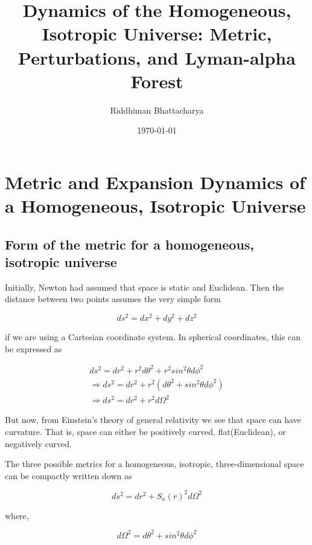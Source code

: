 \documentclass[a4,12pt,oneside]{report}
\begin{document}
	\title{\textbf{Dynamics of the Homogeneous, Isotropic Universe: Metric, Perturbations, and Lyman-alpha Forest}}
\author{Riddhiman Bhattacharya}	
 \date{\today}
	
	\maketitle
	
	
	\tableofcontents

	
	\chapter{Metric and Expansion Dynamics of a Homogeneous, Isotropic Universe}
	
	\section{Form of the metric for a homogeneous, isotropic universe}
	
	Initially, Newton had assumed that space is static and Euclidean. Then the distance between two points assumes the very simple form
	
	\begin{equation}
		ds^2=dx^2+dy^2+dz^2
	\end{equation}
	
	if we are using a Cartesian coordinate system. In spherical coordinates, this can be expressed as

	\begin{align}
	ds^2=dr^2+ r^2d\theta^2 + r^2sin^2\theta d\phi^2	\\
	\Rightarrow ds^2=dr^2+ r^2(d\theta^2+sin^2\theta d\phi^2) \\
	\Rightarrow ds^2=dr^2+ r^2d\Omega^2 
	\end{align}
	
	But now, from Einstein's theory of general relativity we see that space can have curvature. That is, space can either be positively curved, flat(Euclidean), or negatively curved.
	
	The three possible metrics for a homogeneous, isotropic, three-dimensional space can be compactly written down as
	
	\begin{equation}
	    ds^2=dr^2+S_\kappa(r)^2d\Omega^2
	\end{equation}
	
	where,
	
	\begin{equation}
		d\Omega^2=d\theta^2+sin^2\theta d\phi^2
	\end{equation}
	
\end{document}
